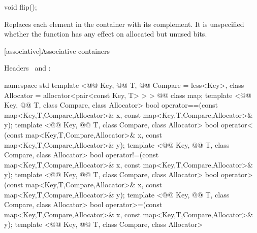 \documentclass[american,twoside]{book}
\begin{document}
\begin{itemdecl}
void flip();
\end{itemdecl}

\begin{itemdescr}
\pnum
\effects Replaces each element in the container with its complement.
It is unspecified whether the function has any effect on allocated but unused bits.
\end{itemdescr}

[associative]{Associative containers}

\pnum
Headers \ and :

%

\begin{codeblock}
namespace std {
  template <@@ Key, @@ T, 
            @@ Compare = less<Key>,
            class Allocator = allocator<pair<const Key, T> > >
    @@
    class map;
  template <@@ Key, @@ T, class Compare, class Allocator>
    bool operator==(const map<Key,T,Compare,Allocator>& x,
                    const map<Key,T,Compare,Allocator>& y);
  template <@@ Key, @@ T, class Compare, class Allocator>
    bool operator< (const map<Key,T,Compare,Allocator>& x,
                    const map<Key,T,Compare,Allocator>& y);
  template <@@ Key, @@ T, class Compare, class Allocator>
    bool operator!=(const map<Key,T,Compare,Allocator>& x,
                    const map<Key,T,Compare,Allocator>& y);
  template <@@ Key, @@ T, class Compare, class Allocator>
    bool operator> (const map<Key,T,Compare,Allocator>& x,
                    const map<Key,T,Compare,Allocator>& y);
  template <@@ Key, @@ T, class Compare, class Allocator>
    bool operator>=(const map<Key,T,Compare,Allocator>& x,
                    const map<Key,T,Compare,Allocator>& y);
  template <@@ Key, @@ T, class Compare, class Allocator>
}
\end{codeblock}
\end{document}
